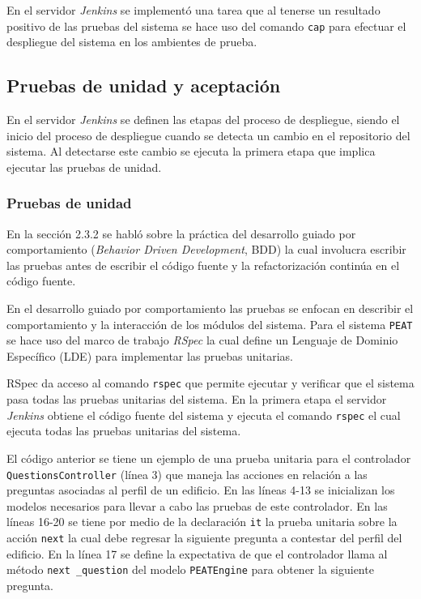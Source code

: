 En el servidor \textit{Jenkins} se implementó una tarea que al tenerse un resultado
positivo de las pruebas del sistema se hace uso del comando \texttt{cap}
para efectuar el despliegue del sistema en los ambientes de prueba.

\subsection{Pruebas de unidad y aceptación}

En el servidor \textit{Jenkins} se definen las etapas del proceso de despliegue,
siendo el inicio del proceso de despliegue cuando se detecta un cambio en el
repositorio del sistema. Al detectarse este cambio se ejecuta la primera etapa
que implica ejecutar las pruebas de unidad.

\subsubsection{Pruebas de unidad}

En la sección 2.3.2 se habló sobre la práctica del desarrollo guiado por
comportamiento (\textit{Behavior Driven Development}, BDD) la cual involucra
escribir las pruebas antes de escribir el código fuente y la refactorización
continúa en el código fuente.

En el desarrollo guiado por comportamiento las pruebas se enfocan en describir el
comportamiento y la interacción de los módulos del sistema. Para el sistema
\texttt{PEAT} se hace uso del marco de trabajo \textit{RSpec} la cual define un
Lenguaje de Dominio Específico (LDE) para implementar las pruebas unitarias.

RSpec da acceso al comando \texttt{rspec} que permite ejecutar y verificar
que el sistema pasa todas las pruebas unitarias del sistema. En la primera
etapa el servidor \textit{Jenkins} obtiene el código fuente del sistema y ejecuta el
comando \texttt{rspec} el cual ejecuta todas las pruebas unitarias del sistema.



El código anterior se tiene un ejemplo de una prueba unitaria para el controlador
\texttt{QuestionsController} (línea 3) que maneja las acciones en relación
a las preguntas asociadas al perfil de un edificio. En las líneas 4-13 se
inicializan los modelos necesarios para llevar a cabo las pruebas de este
controlador.
En las líneas 16-20 se tiene por medio de la declaración \texttt{it} la
prueba unitaria sobre la acción \texttt{next} la cual debe regresar
la siguiente pregunta a contestar del perfil del edificio. En la línea
17 se define la expectativa de que el controlador llama al método \texttt{next
  \_question} del modelo \texttt{PEATEngine} para obtener la siguiente pregunta.

